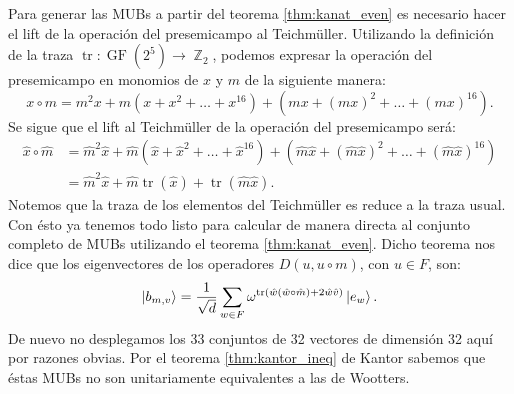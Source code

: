 \documentclass[a4paper]{report}
\DeclareMathOperator{\Z}{\mathbb{Z}}
\DeclareMathOperator{\tr}{tr}
\DeclareMathOperator{\GF}{GF}
\begin{document}
  Para generar las MUBs a partir del teorema
  \ref{thm:kanat_even} es necesario hacer el lift de la
  operación del presemicampo al Teichmüller. Utilizando la
  definición de la traza $\tr : \GF(2^{5}) \to \Z_2$,
  podemos expresar la operación del presemicampo en monomios
  de $x$ y $m$ de la siguiente manera:
  \begin{equation}
    x \circ m
    = m^2 x + m \left( x + x^2 + \ldots + x^{16} \right) +
    \left( mx + (mx)^2 + \ldots + (mx)^{16} \right).
  \end{equation}
  Se sigue que el lift al Teichmüller de la operación del
  presemicampo será: 
  \begin{align}
    \hat x \circ \hat m
    &= \hat m^2 \hat x + \hat m \left( \hat x + \hat x^2 +
    \ldots + \hat x^{16} \right) +
    \left( \hat m \hat x + (\hat m \hat x)^2 + \ldots +
    (\hat m \hat x)^{16} \right) \\
    &= \hat m^2 \hat x + \hat m \tr(\hat x) + \tr(\hat m
    \hat x).
  \end{align}
  Notemos que la traza de los elementos del Teichmüller es
  reduce a la traza usual. Con ésto ya tenemos todo listo
  para calcular de manera directa al conjunto completo de
  MUBs utilizando el teorema \ref{thm:kanat_even}. Dicho
  teorema nos dice que los eigenvectores de los operadores
  $D(u,u \circ m)$, con $u \in F$, son:
  \begin{equation}
    \ket{b_{m,v}}
    = \frac{1}{\sqrt{d}} 
    \sum_{w \in F}^{} \omega^{\tr\left( \hat w (\hat w \circ
    \hat m) + 2 \hat w \hat v\right) } \ket{e_w}.
  \end{equation}
  De nuevo no desplegamos los 33 conjuntos de 32 vectores de
  dimensión 32 aquí por razones obvias. Por el teorema
  \ref{thm:kantor_ineq} de Kantor  sabemos que éstas MUBs no
  son unitariamente equivalentes a las de Wootters.
\end{document}
